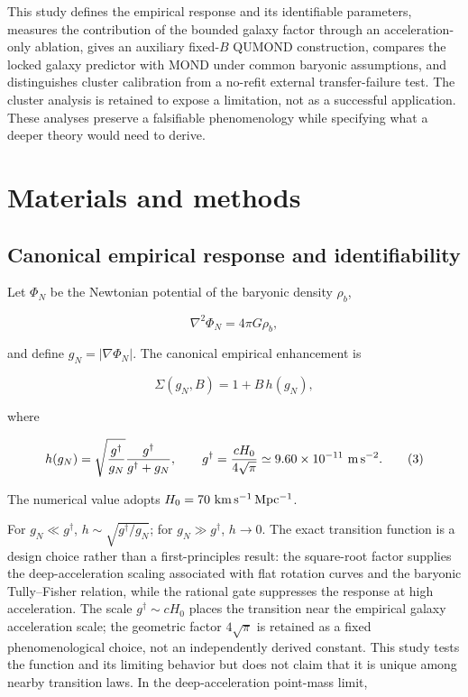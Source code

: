 \documentclass[utf8]{FrontiersinHarvard}
\begin{document}
This study defines the empirical response and its identifiable parameters, measures the contribution of the bounded galaxy factor through an acceleration-only ablation, gives an auxiliary fixed-\(B\) QUMOND construction, compares the locked galaxy predictor with MOND under common baryonic assumptions, and distinguishes cluster calibration from a no-refit external transfer-failure test. The cluster analysis is retained to expose a limitation, not as a successful application. These analyses preserve a falsifiable phenomenology while specifying what a deeper theory would need to derive.

\section{Materials and methods}\label{materials-and-methods}

\subsection{Canonical empirical response and identifiability}\label{canonical-empirical-response-and-identifiability}

Let \(\Phi_N\) be the Newtonian potential of the baryonic density \(\rho_b\),

\[
\nabla^2\Phi_N=4\pi G\rho_b,
\tag{1}
\]

and define \(g_N=|\nabla\Phi_N|\). The canonical empirical enhancement is

\[
\Sigma(g_N,B)=1+B\,h(g_N),
\tag{2}
\]

where

\[
h(g_N)=\sqrt{\frac{g^\dagger}{g_N}}
\frac{g^\dagger}{g^\dagger+g_N},
\qquad
g^\dagger=\frac{cH_0}{4\sqrt{\pi}}
\simeq9.60\times10^{-11}\ {\rm m\,s^{-2}} .
\tag{3}
\]

The numerical value adopts \(H_0=70\ {\rm km\,s^{-1}\,Mpc^{-1}}\).

For \(g_N\ll g^\dagger\), \(h\sim\sqrt{g^\dagger/g_N}\); for \(g_N\gg g^\dagger\), \(h\rightarrow0\). The exact transition function is a design choice rather than a first-principles result: the square-root factor supplies the deep-acceleration scaling associated with flat rotation curves and the baryonic Tully--Fisher relation, while the rational gate suppresses the response at high acceleration. The scale \(g^\dagger\sim cH_0\) places the transition near the empirical galaxy acceleration scale; the geometric factor \(4\sqrt{\pi}\) is retained as a fixed phenomenological choice, not an independently derived constant. This study tests the function and its limiting behavior but does not claim that it is unique among nearby transition laws. In the deep-acceleration point-mass limit,
\end{document}
